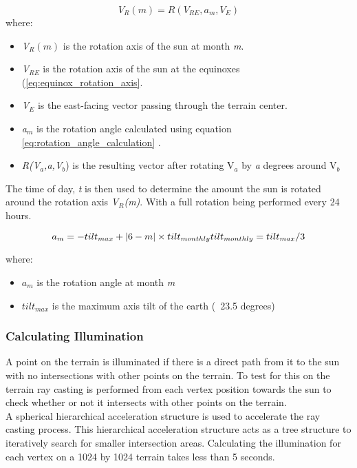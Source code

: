 \begin{equation} \label{eq:all_month_rotation_axis}
	V_{R}(m) = R(V_{RE}, a_{m}, V_{E})
\end{equation}
where:
\begin{itemize}
\item \textit{V$_{R}(m)$} is the rotation axis of the sun at month \textit{m}.\\
\item \textit{V$_{RE}$} is the rotation axis of the sun at the equinoxes (\ref{eq:equinox_rotation_axis}.\\
\item \textit{V$_{E}$} is the east-facing vector passing through the terrain center.\\
\item \textit{a$_{m}$} is the rotation angle calculated using equation \ref{eq:rotation_angle_calculation} .\\
\item \textit{R(V$_{a}$,\textit{a},V$_{b}$}) is the resulting vector after rotating V$_{a}$ by \textit{a} degrees around V$_{b}$\\
\end{itemize}

The time of day, \textit{t} is then used to determine the amount the sun is rotated around the rotation axis \textit{V$_{R}$(m)}. With a full rotation being performed every 24 hours.

\begin{equation} \label{eq:rotation_angle_calculation}
	a_{m} = -tilt_{max} + |6-m| \times tilt_{monthly} $$\\
$$
tilt_{monthly} = tilt_{max}/3
\end{equation}

where:
\begin{itemize}
\item \textit{$a_{m}$} is the rotation angle at month \textit{m}
\item \textit{$tilt_{max}$} is the maximum axis tilt of the earth (~23.5 degrees)
\end{itemize}

\subsubsection{Calculating Illumination}

A point on the terrain is illuminated if there is a direct path from it to the sun with no intersections with other points on the terrain. To test for this on the terrain ray casting is performed from each vertex position towards the sun to check whether or not it intersects with other points on the terrain.\\
A spherical hierarchical acceleration structure is used to accelerate the ray casting process. This hierarchical acceleration structure acts as a tree structure to iteratively search for smaller intersection areas. Calculating the illumination for each vertex on a 1024 by 1024 terrain takes less than 5 seconds.

